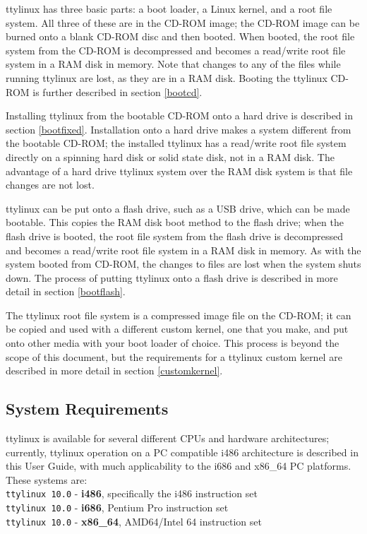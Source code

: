 \documentclass[10pt]{article}
\begin{document}
ttylinux has three basic parts: a boot loader, a Linux kernel, and a root
file system. All three of these are in the CD-ROM image; the CD-ROM image can
be burned onto a blank CD-ROM disc and then booted. When booted, the root
file system from the CD-ROM is decompressed and becomes a read/write root file
system in a RAM disk in memory. Note that changes to any of the files while
running ttylinux are lost, as they are in a RAM disk. Booting the ttylinux
CD-ROM is further described in section \ref{bootcd}.

Installing ttylinux from the bootable CD-ROM onto a hard drive is described in
section \ref{bootfixed}. Installation onto a hard drive makes a system
different from the bootable CD-ROM; the installed ttylinux has a read/write
root file system directly on a spinning hard disk or solid state disk, not in a
RAM disk. The advantage of a hard drive ttylinux system over the RAM disk
system is that file changes are not lost.

ttylinux can be put onto a flash drive, such as a USB drive, which can be made
bootable. This copies the RAM disk boot method to the flash drive; when the
flash drive is booted, the root file system from the flash drive is decompressed
and becomes a read/write root file system in a RAM disk in memory. As with the
system booted from CD-ROM, the changes to files are lost when the system shuts
down. The process of putting ttylinux onto a flash drive is described in more
detail in section \ref{bootflash}.

The ttylinux root file system is a compressed image file on the CD-ROM; it can
be copied and used with a different custom kernel, one that you make, and put
onto other media with your boot loader of choice. This process is beyond the
scope of this document, but the requirements for a ttylinux custom kernel are
described in more detail in section \ref{customkernel}.

\subsection{System Requirements}

ttylinux is available for several different CPUs and hardware architectures;
currently, ttylinux operation on a PC compatible i486 architecture is described
in this User Guide, with much applicability to the i686 and x86\_64 PC
platforms. These systems are:\\
{\tt ttylinux 10.0} - {\bf i486}, specifically the i486 instruction set\\
{\tt ttylinux 10.0} - {\bf i686}, Pentium Pro instruction set\\
{\tt ttylinux 10.0} - {\bf x86\_64}, AMD64/Intel 64 instruction set
\end{document}
